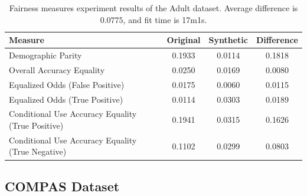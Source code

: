 \documentclass[manuscript,screen,review,anonymous]{acmart}
\begin{document}
\begin{table}[h]
\caption{
    Fairness measures experiment results of the Adult dataset.
    Average difference is $0.0775$, and fit time is 17m1s.
}

\label{tab:adult_score}
\begin{tabular}{lccc}
\toprule
\textbf{Measure} & \textbf{Original} & \textbf{Synthetic} & \textbf{Difference} \\
\midrule
Demographic Parity  & 0.1933 & 0.0114 & 0.1818 \\
Overall Accuracy Equality   & 0.0250 & 0.0169 & 0.0080 \\
Equalized Odds (False Positive)    & 0.0175 & 0.0060 & 0.0115 \\
Equalized Odds (True Positive)    & 0.0114 & 0.0303 & 0.0189 \\
Conditional Use Accuracy Equality (True Positive) & 0.1941 & 0.0315 & 0.1626 \\
Conditional Use Accuracy Equality (True Negative) & 0.1102 & 0.0299 & 0.0803 \\
\bottomrule
\end{tabular}
\end{table}

\subsection{COMPAS Dataset}
\end{document}
